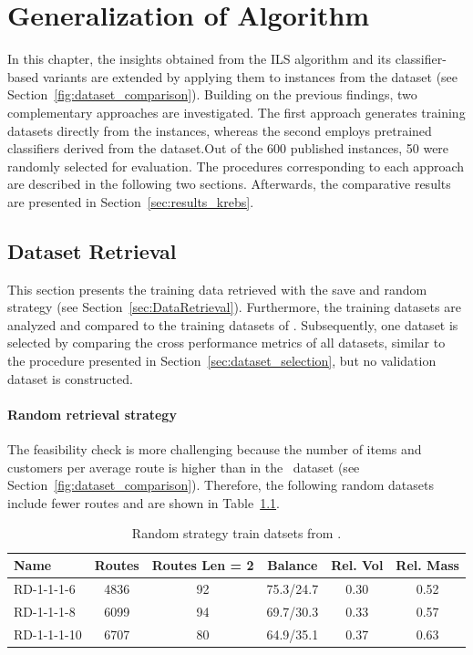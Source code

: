 
\chapter{Generalization of Algorithm}
\label{chap:application_krebs}


In this chapter, the insights obtained from the \gls{ILS} algorithm and its classifier-based variants are extended by
applying them to instances from the \krebsADataSetText dataset (see Section~\ref{fig:dataset_comparison}). Building on
the previous findings, two complementary approaches are investigated. The first approach generates training datasets
directly from the \krebsADataSetText instances, whereas the second employs pretrained classifiers derived from the
\gendreauDataSetText dataset.Out of the 600 published instances, 50 were randomly selected for evaluation.
The procedures corresponding to each approach are described in the following two sections.
Afterwards, the comparative results are presented in Section~\ref{sec:results_krebs}.


\section{Dataset Retrieval}
\label{sec:krebs_data_retrieval}

This section presents the training data retrieved with the save and random strategy (see Section~\ref{sec:DataRetrieval}). Furthermore,
the training datasets are analyzed and compared to the training datasets of \gendreauDataSet. Subsequently, one dataset is selected by
comparing the cross performance metrics of all datasets, similar to the procedure presented in Section~\ref{sec:dataset_selection}, but no
validation dataset is constructed.

\subsubsection{Random retrieval strategy}
The feasibility check is more challenging because the number of items and customers per average route is higher than in the
\gendreauDataSetText~dataset (see Section~\ref{fig:dataset_comparison}). Therefore, the following random datasets include fewer
routes and are shown in Table~\ref{tab:random_instances_krebs}.
\begin{table}[ht]
    \centering
    \begin{tabular}{l c c c c c }
        \toprule
        Name        & Routes & Routes Len = 2 & Balance   & Rel. Vol & Rel. Mass \\
        \midrule
        RD-1-1-1-6  & 4836   & 92             & 75.3/24.7 & 0.30     & 0.52      \\
        RD-1-1-1-8  & 6099   & 94             & 69.7/30.3 & 0.33     & 0.57      \\
        RD-1-1-1-10 & 6707   & 80             & 64.9/35.1 & 0.37     & 0.63      \\

        \bottomrule
    \end{tabular}
    \caption{Random strategy train datsets from \krebsADataSet.}
    \label{tab:random_instances_krebs}
\end{table}

